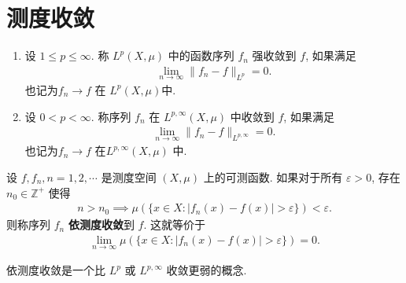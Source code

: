 \documentclass[../../main.tex]{subfiles}%
\begin{document}
\section{测度收敛}

\begin{definition}
\begin{enumerate}[(1)]
\item 设 \(1 \leqslant p \leqslant \infty\). 称 \(L^p(X, \mu)\) 中的函数序列 \(f_n\) 强收敛到 \(f\), 如果满足
\begin{align*}
\lim\limits_{n \to \infty} \|f_n - f\|_{L^p} = 0.
\end{align*}
也记为\(f_n \to f\) 在 \(L^p(X, \mu)\)中.

\item 设 \(0 < p < \infty\). 
称序列 \(f_n\) 在 \(L^{p,\infty}(X, \mu)\) 中收敛到 \(f\), 如果满足
\begin{align*}
\lim\limits_{n \to \infty} \|f_n - f\|_{L^{p,\infty}} = 0.
\end{align*}
也记为\(f_n \to f\) 在\(L^{p,\infty}(X, \mu)\) 中.
\end{enumerate}
\end{definition}

\begin{definition}
设 \(f, f_n, n=1, 2, \cdots\) 是测度空间 \((X,\mu)\) 上的可测函数. 如果对于所有 \(\varepsilon > 0\), 存在 \(n_0 \in \mathbb{Z}^+\) 使得
\begin{align*}
n > n_0 \implies \mu(\{x \in X : |f_n(x) - f(x)| > \varepsilon\}) < \varepsilon. 
\end{align*}
则称序列 \(f_n\) \textbf{依测度收敛}到 \(f\). 这就等价于
\begin{align*}
\lim\limits_{n \to \infty} \mu(\{x \in X : |f_n(x) - f(x)| > \varepsilon\}) = 0. 
\end{align*}
\end{definition}
\begin{remark}
依测度收敛是一个比 \(L^p\) 或 \(L^{p,\infty}\) 收敛更弱的概念.
\end{remark}
\end{document}
